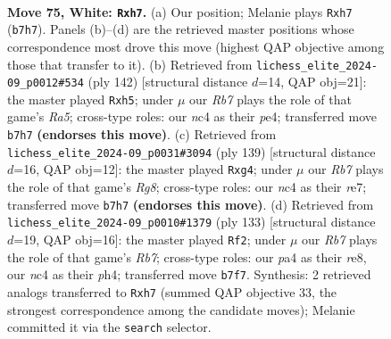 \documentclass[11pt]{article}
\begin{document}
\clearpage

\begin{figure}[p]\centering
\begin{subfigure}{0.46\textwidth}\centering
\resizebox{\linewidth}{!}{%
\newchessgame
\chessboard[
  setfen={8/1R5p/6pP/2k2p2/p1n2P2/8/7K/8 w - - 1 75},
  showmover=false,
  pgfstyle=straightmove, color=movearrow, markmove={b7-h7}
]}
\caption{}
\end{subfigure}\hfill
\begin{subfigure}{0.46\textwidth}\centering
\resizebox{\linewidth}{!}{%
\newchessgame
\chessboard[
  setfen={1K6/8/8/R6p/3kp1p1/6P1/7P/8 w - - 0 72},
  showmover=false,
  pgfstyle=straightmove, color=movearrow, markmove={a5-h5}
]}
\caption{}
\end{subfigure}
\\[4pt]
\begin{subfigure}{0.46\textwidth}\centering
\resizebox{\linewidth}{!}{%
\newchessgame
\chessboard[
  setfen={6k1/3KR3/5p1p/5P1P/6P1/8/8/6r1 b - - 46 70},
  showmover=false,
  pgfstyle=straightmove, color=movearrow, markmove={g1-g4}
]}
\caption{}
\end{subfigure}\hfill
\begin{subfigure}{0.46\textwidth}\centering
\resizebox{\linewidth}{!}{%
\newchessgame
\chessboard[
  setfen={4R3/6k1/8/5p1p/7P/5P1K/1r4P1/8 b - - 53 67},
  showmover=false,
  pgfstyle=straightmove, color=movearrow, markmove={b2-f2}
]}
\caption{}
\end{subfigure}
\caption{\textbf{Move 75, White: \texttt{Rxh7}.} (a) Our position; Melanie plays \texttt{Rxh7} (\texttt{b7h7}). Panels (b)--(d) are the retrieved master positions whose correspondence most drove this move (highest QAP objective among those that transfer to it). (b) Retrieved from \texttt{lichess\_elite\_2024-09\_p0012\#534} (ply 142) [structural distance $d$=14, QAP obj=21]: the master played \texttt{Rxh5}; under $\mu$ our \emph{Rb7} plays the role of that game's \emph{Ra5}; cross-type roles: our \emph{n}c4 as their \emph{p}e4; transferred move \texttt{b7h7} \textbf{(endorses this move)}. (c) Retrieved from \texttt{lichess\_elite\_2024-09\_p0031\#3094} (ply 139) [structural distance $d$=16, QAP obj=12]: the master played \texttt{Rxg4}; under $\mu$ our \emph{Rb7} plays the role of that game's \emph{Rg8}; cross-type roles: our \emph{n}c4 as their \emph{r}e7; transferred move \texttt{b7h7} \textbf{(endorses this move)}. (d) Retrieved from \texttt{lichess\_elite\_2024-09\_p0010\#1379} (ply 133) [structural distance $d$=19, QAP obj=16]: the master played \texttt{Rf2}; under $\mu$ our \emph{Rb7} plays the role of that game's \emph{Rb7}; cross-type roles: our \emph{p}a4 as their \emph{r}e8, our \emph{n}c4 as their \emph{p}h4; transferred move \texttt{b7f7}. Synthesis: 2 retrieved analogs transferred to \texttt{Rxh7} (summed QAP objective 33, the strongest correspondence among the candidate moves); Melanie committed it via the \texttt{search} selector.}
\label{fig:thought-m148}
\end{figure}
\end{document}
